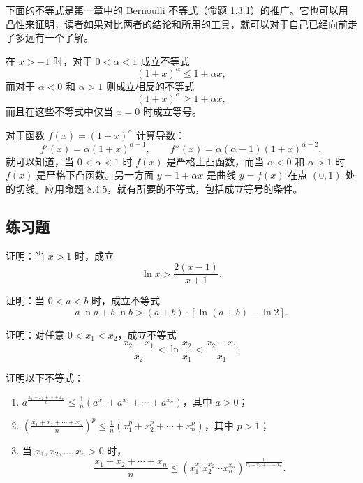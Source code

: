 下面的不等式是第一章中的 Bernoulli 不等式（命题 1.3.1）的推广。它也可以用凸性来证明，读者如果对比两者的结论和所用的工具，就可以对于自己已经向前走了多远有一个了解。

\begin{xtheorem}
在 $x>-1$ 时，对于 $0<\alpha<1$ 成立不等式
\[
  (1+x)^\alpha\le1+\alpha x,
\]
而对于 $\alpha<0$ 和 $\alpha>1$ 则成立相反的不等式
\[
  (1+x)^\alpha\ge1+\alpha x,
\]
而且在这些不等式中仅当 $x=0$ 时成立等号。
\end{xtheorem}
\begin{xproof}
对于函数 $f(x)=(1+x)^\alpha$ 计算导数：
\[
  f'(x)=\alpha(1+x)^{\alpha-1},
  \qquad
  f''(x)=\alpha(\alpha-1)(1+x)^{\alpha-2},
\]
就可以知道，当 $0<\alpha<1$ 时 $f(x)$ 是严格上凸函数，而当 $\alpha<0$ 和 $\alpha>1$ 时 $f(x)$ 是严格下凸函数。另一方面 $y=1+\alpha x$ 是曲线 $y=f(x)$ 在点 $(0,1)$ 处的切线。应用命题 8.4.5，就有所要的不等式，包括成立等号的条件。
\end{xproof}

\subsection{练习题}

\begin{xexercise}[1]
证明：当 $x>1$ 时，成立
  \[
    \ln x>\frac{2(x-1)}{x+1}.
  \]
\end{xexercise}

\begin{xexercise}[2]
证明：当 $0<a<b$ 时，成立不等式
  \[
    a\ln a+b\ln b>(a+b)\cdot[\ln(a+b)-\ln2].
  \]
\end{xexercise}

\begin{xexercise}[3]
证明：对任意 $0<x_1<x_2$，成立不等式
  \[
    \frac{x_2-x_1}{x_2}<\ln\frac{x_2}{x_1}<\frac{x_2-x_1}{x_1}.
  \]
\end{xexercise}

\begin{xexercise}[4]
证明以下不等式：
  \begin{enumerate}[label=(\arabic*)]
    \item $\displaystyle a^{\frac{x_1+x_2+\cdots+x_n}{n}}
    \le\frac1n(a^{x_1}+a^{x_2}+\cdots+a^{x_n})$，其中 $a>0$；
    \item $\displaystyle\left(\frac{x_1+x_2+\cdots+x_n}{n}\right)^p
    \le\frac1n(x_1^p+x_2^p+\cdots+x_n^p)$，其中 $p>1$；
    \item 当 $x_1,x_2,\ldots,x_n>0$ 时，
    \[
      \frac{x_1+x_2+\cdots+x_n}{n}
      \le\left(x_1^{x_1}x_2^{x_2}\cdots x_n^{x_n}\right)^{\frac1{x_1+x_2+\cdots+x_n}}.
    \]
  \end{enumerate}
\end{xexercise}

